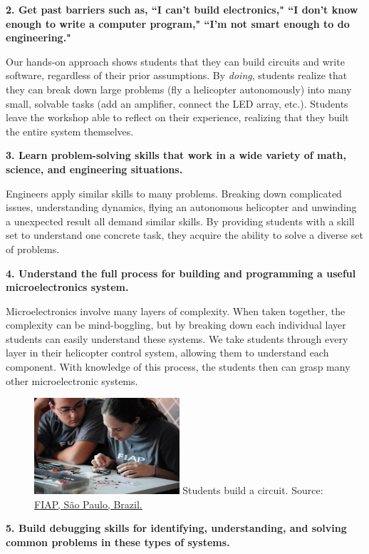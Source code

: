 \documentclass[11pt]{article}
\begin{document}
\textbf{2. Get past barriers such as, ``I can't build electronics," ``I don't know enough to write a computer program," ``I'm not smart enough to do engineering."}

Our hands-on approach shows students that they can build circuits and write software, regardless of their prior assumptions.  By \textit{doing}, students realize that they can break down large problems (fly a helicopter autonomously) into many small, solvable tasks (add an amplifier, connect the LED array, etc.).  Students leave the workshop able to reflect on their experience, realizing that they built the entire system themselves.

\vspace{20pt}
\textbf{3. Learn problem-solving skills that work in a wide variety of math, science, and engineering situations.}

Engineers apply similar skills to many problems.  Breaking down complicated issues, understanding dynamics, flying an autonomous helicopter and unwinding a unexpected result all demand similar skills.  By providing students with a skill set to understand one concrete task, they acquire the ability to solve a diverse set of problems.

\newpage
\textbf{4. Understand the full process for building and programming a useful microelectronics system.}

Microelectronics involve many layers of complexity.  When taken together, the complexity can be mind-boggling, but by breaking down each individual layer students can easily understand these systems.  We take students through every layer in their helicopter control system, allowing them to understand each component.  With knowledge of this process, the students then can grasp many other microelectronic systems.

\vspace{20pt}
\begin{figure}
    \begin{center}
    \includegraphics[width=0.48\textwidth]{figures/fiap_workshop2.jpg}
    {\small Students build a circuit.  Source: \href{http://www.fiap.com.br}{FIAP, S\~ao Paulo, Brazil.}}
    \end{center}
    \vspace{-20pt}
\end{figure}
\textbf{5. Build debugging skills for identifying, understanding, and solving common problems in these types of systems.}
\end{document}

